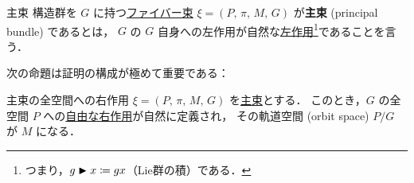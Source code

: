 \documentclass[TQFT_main]{subfiles}
\begin{document}
\begin{mydef}[label=def.PFD]{主束}
    構造群を $G$ に持つ\hyperref[def.fiber-1]{ファイバー束} $\xi = (P,\, \pi,\, M,\, G)$ が\textbf{主束} (principal bundle) であるとは，
    $G$ の $G$ 自身への左作用が自然な\hyperref[def:Lie-action]{左作用}\footnote{つまり，$g \blacktriangleright x \coloneqq gx$（Lie群の積）である．}であることを言う．
\end{mydef}

次の命題は証明の構成が極めて重要である：
\begin{myprop}[label=prop.PFD_right]{主束の全空間への右作用}
	$\xi = (P,\, \pi,\, M,\, G)$ を\hyperref[def.PFD]{主束}とする．
    このとき，$G$ の全空間 $P$ への\hyperref[def:Lie-action]{自由な右作用}が自然に定義され，
	その軌道空間 (orbit space) $P/G$ が $M$ になる．
\end{myprop}
\end{document}

